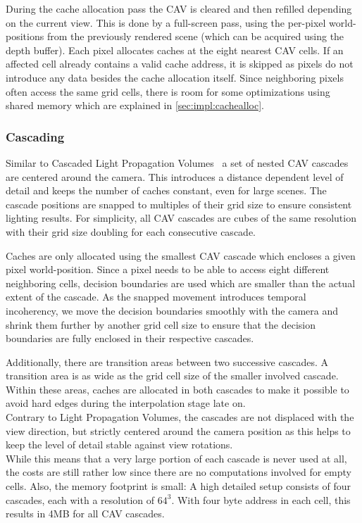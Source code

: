 \documentclass[thesis.tex]{subfiles}
\begin{document}
During the cache allocation pass the CAV is cleared and then refilled depending on the current view.
This is done by a full-screen pass, using the per-pixel world-positions from the previously rendered scene (which can be acquired using the depth buffer).
Each pixel allocates caches at the eight nearest CAV cells.
If an affected cell already contains a valid cache address, it is skipped as pixels do not introduce any data besides the cache allocation itself.
Since neighboring pixels often access the same grid cells, there is room for some optimizations using shared memory which are explained in \ref{sec:impl:cachealloc}.

\subsubsection{Cascading}
Similar to Cascaded Light Propagation Volumes~\cite{bib:lpt} a set of nested CAV cascades are centered around the camera.
This introduces a distance dependent level of detail and keeps the number of caches constant, even for large scenes.
The cascade positions are snapped to multiples of their grid size to ensure consistent lighting results. 
For simplicity, all CAV cascades are cubes of the same resolution with their grid size doubling for each consecutive cascade.

Caches are only allocated using the smallest CAV cascade which encloses a given pixel world-position.
Since a pixel needs to be able to access eight different neighboring cells, decision boundaries are used which are smaller than the actual extent of the cascade.
As the snapped movement introduces temporal incoherency, we move the decision boundaries smoothly with the camera and shrink them further by another grid cell size to ensure that the decision boundaries are fully enclosed in their respective cascades.

Additionally, there are transition areas between two successive cascades.
A transition area is as wide as the grid cell size of the smaller involved cascade.
Within these areas, caches are allocated in both cascades to make it possible to avoid hard edges during the interpolation stage late on.\\

Contrary to Light Propagation Volumes, the cascades are not displaced with the view direction, but strictly centered around the camera position as this helps to keep the level of detail stable against view rotations.\\
While this means that a very large portion of each cascade is never used at all, the costs are still rather low since there are no computations involved for empty cells.
Also, the memory footprint is small: %
A high detailed setup consists of four cascades, each with a resolution of $64^3$.
With four byte address in each cell, this results in 4MB for all CAV cascades. 
\end{document}
